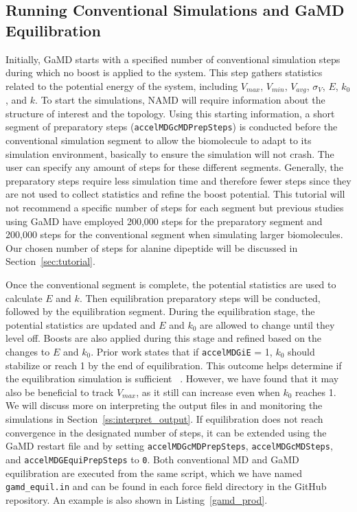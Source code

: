 \documentclass[9pt,tutorial]{livecoms}
\begin{document}
\subsection{Running Conventional Simulations and GaMD Equilibration} \label{ss:cmd_gamd_equil}
Initially, GaMD starts with a specified number of conventional simulation steps during which no boost is applied to the system. This step gathers statistics related to the potential energy of the system, including $V_{max}$, $V_{min}$, $V_{avg}$, $\sigma_{V}$, $E$, $k_{0}$, and $k$. To start the simulations, NAMD will require information about the structure of interest and the topology. Using this starting information, a short segment of preparatory steps (\texttt{accelMDGcMDPrepSteps}) is conducted before the conventional simulation segment to allow the biomolecule to adapt to its simulation environment, basically to ensure the simulation will not crash. The user can specify any amount of steps for these different segments. Generally, the preparatory steps require less simulation time and therefore fewer steps since they are not used to collect statistics and refine the boost potential. This tutorial will not recommend a specific number of steps for each segment but previous studies using GaMD have employed 200,000 steps for the preparatory segment and 200,000 steps for the conventional segment when simulating larger biomolecules. Our chosen number of steps for alanine dipeptide will be discussed in Section~\ref{sec:tutorial}.

Once the conventional segment is complete, the potential statistics are used to calculate $E$ and $k$. Then equilibration preparatory steps will be conducted, followed by the equilibration segment. During the equilibration stage, the potential statistics are updated and $E$ and $k_{0}$ are allowed to change until they level off. Boosts are also applied during this stage and refined based on the changes to $E$ and $k_{0}$. Prior work states that if \texttt{accelMDGiE} = 1, $k_{0}$ should stabilize or reach 1 by the end of equilibration. This outcome helps determine if the equilibration simulation is sufficient ~\cite{miao_gaussian_2015}. However, we have found that it may also be beneficial to track $V_{max}$, as it still can increase even when $k_{0}$ reaches 1. We will discuss more on interpreting the output files in and monitoring the simulations in Section~\ref{ss:interpret_output}. If equilibration does not reach convergence in the designated number of steps, it can be extended using the GaMD restart file and by setting \texttt{accelMDGcMDPrepSteps}, \texttt{accelMDGcMDSteps}, and \texttt{accelMDGEquiPrepSteps} to \texttt{0}. Both conventional MD and GaMD equilibration are executed from the same script, which we have named \texttt{gamd\_equil.in} and can be found in each force field directory in the GitHub repository. An example is also shown in Listing~\ref{gamd_prod}.
\end{document}
